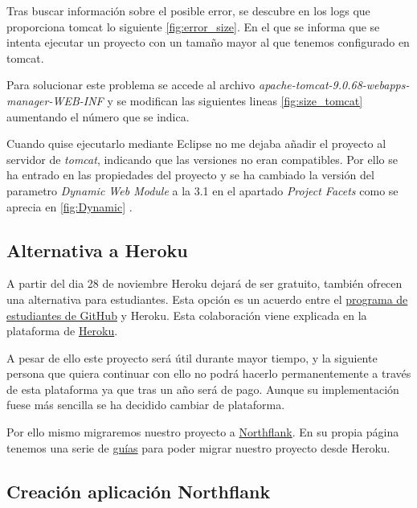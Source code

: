 Tras buscar información sobre el posible error, se descubre en los logs que proporciona tomcat lo siguiente \ref{fig:error_size}. En el que se informa que se intenta ejecutar un proyecto con un tamaño mayor al que tenemos configurado en tomcat.


Para solucionar este problema se accede al archivo \emph{apache-tomcat-9.0.68-webapps-manager-WEB-INF} y se modifican las siguientes lineas \ref{fig:size_tomcat} aumentando el número que se indica.


Cuando quise ejecutarlo mediante Eclipse no me dejaba añadir el proyecto al servidor de \emph{tomcat}, indicando que las versiones no eran compatibles. Por ello se ha entrado en las propiedades del proyecto y se ha cambiado la versión del parametro \emph{Dynamic Web Module} a la 3.1 en el apartado \emph{Project Facets} como se aprecia en \ref{fig:Dynamic} .

 
\subsection{Alternativa a Heroku}

A partir del dia 28 de noviembre Heroku dejará de ser gratuito, también ofrecen una alternativa para estudiantes. Esta opción es un acuerdo entre el \href{https://education.github.com}{programa de estudiantes de GitHub} y Heroku. 
Esta colaboración viene explicada en la plataforma de \href{https://blog.heroku.com/github-student-developer-program}{Heroku}.

A pesar de ello este proyecto será útil durante mayor tiempo, y la siguiente persona que quiera continuar con ello no podrá hacerlo permanentemente a través de esta plataforma ya que tras un año será de pago. Aunque su implementación fuese más sencilla se ha decidido cambiar de plataforma.

Por ello mismo migraremos nuestro proyecto a \href{https://northflank.com/}{Northflank}. En su propia página tenemos una serie de \href{https://northflank.com/docs/v1/application/migrate-from-heroku}{guías} para poder migrar nuestro proyecto desde Heroku.

\subsection{Creación aplicación Northflank}

